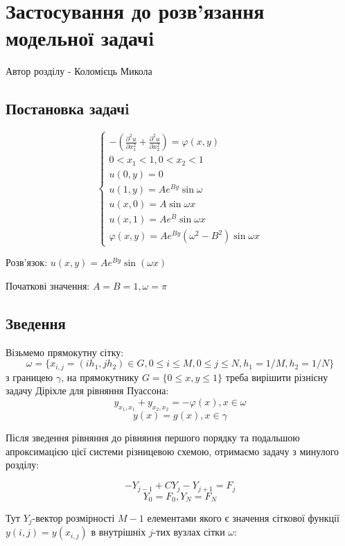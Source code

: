 \chapter{Застосування до розв’язання модельної задачi}

Автор розділу - Коломієць Микола

\section{Постановка задачi}

\begin{equation}
    \begin{cases}
        - (\frac{\partial^2 u}{\partial x_1 ^ 2} 
        + \frac{\partial ^2 u}{\partial x_2^2}) = \varphi(x,y) \\
        0 < x_1 < 1, 0 < x_2 < 1 \\
        u(0,y) = 0 \\
        u(1,y) = A e^{By}\sin \omega \\
        u(x,0) = A \sin \omega x \\
        u(x,1) = A e^B \sin \omega x \\
        \varphi(x,y) = A e^{By} (\omega^2 - B^2)\sin \omega x
    \end{cases}
\end{equation}


Розв'язок: $u(x, y) = A e^{By}\sin(\omega x)$


Початкові значення: $A=B=1, \omega = \pi$

\section{Зведення}

Візьмемо прямокутну сітку:
$$ \omega = \{ x_{i,j} = (ih_1, jh_2) \in G, 
0 \le i \le M, 0 \le j \le N, h_1 = 1 / M, h_2 = 1 / N \} $$
з границею $\gamma$, на прямокутнику $G = \{0 \le x, y \le 1 \}$
треба вирішити різнісну задачу Діріхле для рівняння Пуассона: 
$$ y_{x_1, x_1} + y_{x_2, x_2} = -\varphi(x), x\in \omega $$
$$ y(x) = g(x), x \in \gamma $$


Після зведення рівняння до рівняння першого порядку та подальшою 
апроксимацією цієї системи різницевою схемою, отримаємо задачу з минулого 
розділу:

$$ -Y_{j-1} + C Y_j - Y_{j+1} = F_j $$
$$ Y_0 = F_0, Y_N = F_N $$

Тут $Y_j$-вектор розмірності $M-1$ елементами якого є значення сіткової функції 
$y(i, j)= y(x_{i,j})$ в внутрішніх $j$-тих вузлах сітки $\omega$:

